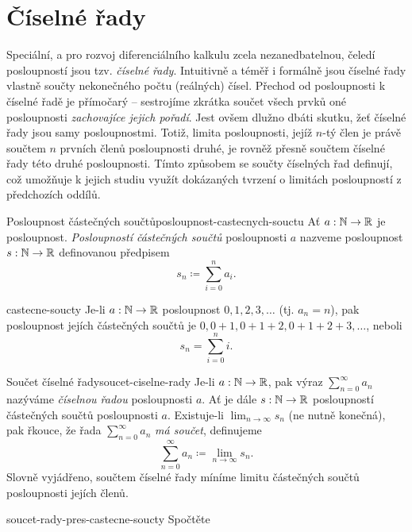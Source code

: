 \section{Číselné řady}
\label{sec:ciselne-rady}

Speciální, a pro rozvoj diferenciálního kalkulu zcela nezanedbatelnou, čeledí
posloupností jsou tzv. \emph{číselné řady}. Intuitivně a téměř i formálně jsou
číselné řady vlastně součty nekonečného počtu (reálných) čísel. Přechod od
posloupnosti k číselné řadě je přímočarý -- sestrojíme zkrátka součet všech
prvků oné posloupnosti \emph{zachovajíce jejich pořadí}. Jest ovšem dlužno dbáti
skutku, žeť číselné řady jsou samy posloupnostmi. Totiž, limita posloupnosti,
jejíž $n$-tý člen je právě součtem $n$ prvních členů posloupnosti druhé, je
rovněž přesně součtem číselné řady této druhé posloupnosti. Tímto způsobem se
součty číselných řad definují, což umožňuje k jejich studiu využít dokázaných
tvrzení o limitách posloupností z předchozích oddílů.

\begin{definition}{Posloupnost částečných součtů}{posloupnost-castecnych-souctu}
 Ať $a:\mathbb{N} \to \mathbb{R}$ je posloupnost. \emph{Posloupností částečných součtů}
 posloupnosti $a$ nazveme posloupnost $s:\mathbb{N} \to \mathbb{R}$ definovanou předpisem
 \[
  s_n \coloneqq \sum_{i = 0}^{n} a_i.
 \]
\end{definition}

\begin{example}{}{castecne-soucty}
 Je-li $a:\mathbb{N} \to \mathbb{R}$ posloupnost $0,1,2,3,\ldots$ (tj. $a_n = n$), pak
 posloupnost jejích částečných součtů je $0,0+1,0+1+2,0+1+2+3,\ldots$, neboli
 \[
  s_n = \sum_{i=0}^{n} i.
 \]
\end{example}

\begin{definition}{Součet číselné řady}{soucet-ciselne-rady}
 Je-li $a:\mathbb{N} \to \mathbb{R}$, pak výraz $\sum_{n=0}^{\infty} a_n$ nazýváme
 \emph{číselnou řadou} posloupnosti $a$. Ať je dále $s:\mathbb{N} \to \mathbb{R}$ posloupností
 částečných součtů posloupnosti $a$. Existuje-li $\lim_{n \to \infty} s_n$ (ne
 nutně konečná), pak řkouce, že řada $\sum_{n=0}^{\infty} a_n$ \emph{má součet},
 definujeme
 \[
  \sum_{n=0}^{\infty} a_n \coloneqq \lim_{n \to \infty} s_n.
 \]
 Slovně vyjádřeno, součtem číselné řady míníme limitu částečných součtů
 posloupnosti jejích členů.
\end{definition}

\begin{problem}{}{soucet-rady-pres-castecne-soucty}
 Spočtěte
\end{problem}
